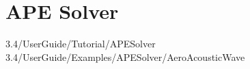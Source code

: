 \chapter{APE Solver}

3.4/UserGuide/Tutorial/APESolver
3.4/UserGuide/Examples/APESolver/AeroAcousticWave
